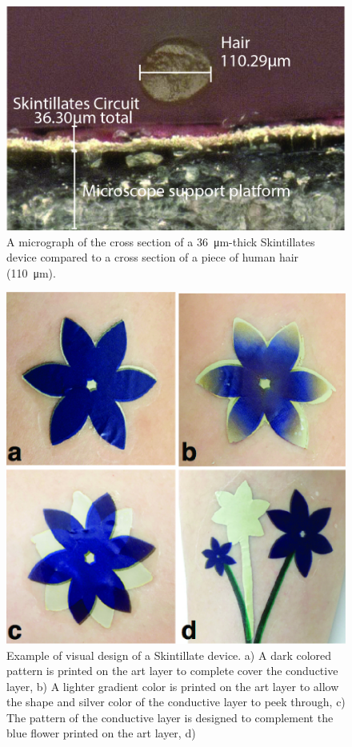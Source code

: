 \documentclass{sigchi}
\begin{document}
\begin{figure}[!ht]
\centering
\includegraphics[width=1\columnwidth]{figures/Figure2}
\caption{A micrograph of the cross section of a \SI{36}{\micro\metre}-thick Skintillates device compared to a cross section of a piece of human
hair (\SI{110}{\micro\metre}).}
\vspace{-8pt}
\label{fig:micrograph}
\end{figure}

\begin{figure}[!h]
\centering
\includegraphics[width=0.8\columnwidth]{figures/Figure5}
\caption{Example of visual design of a Skintillate device. a) A dark colored pattern is printed on the art layer to complete cover the conductive layer, b) A lighter gradient color is printed on the art layer to allow the shape and silver color of the conductive layer to peek through, c) The pattern of the conductive layer is designed to complement the blue flower printed on the art layer, d)}
\vspace{-8pt}
\label{fig:design}
\end{figure}
\end{document}
